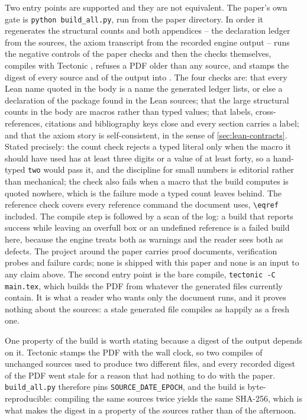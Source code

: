 Two entry points are supported and they are not equivalent. The paper's own gate
is \texttt{python build\_all.py}, run from the paper directory. In order it
regenerates the structural counts and both appendices -- the declaration ledger
from the sources, the axiom transcript from the recorded engine output -- runs the
negative controls of the paper checks and then the checks themselves, compiles
with Tectonic \TectonicVersion{}, refuses a PDF older than any source, and stamps
the digest of every source and of the output into .
The four checks are: that every Lean name quoted in the body is a name the
generated ledger lists, or else a declaration of the package found in the Lean
sources; that the large structural counts in the body are macros rather than
typed values; that labels, cross-references, citations and bibliography
keys close and every section carries a label; and that the axiom story is
self-consistent, in the sense of \cref{sec:lean-contracts}. Stated precisely: the
count check rejects a typed literal only when the macro it should have used has
at least three digits or a value of at least forty, so a hand-typed
\texttt{two} would pass it, and the discipline for small numbers is editorial
rather than mechanical; the check also fails when a macro that the build computes
is quoted nowhere, which is the failure mode a typed count leaves behind. The
reference check covers every reference command the document uses, \verb|\eqref|
included. The compile step is followed by a scan of the log: a build that reports
success while leaving an overfull box or an undefined reference is a failed build
here, because the engine treats both as warnings and the reader sees both as
defects. The project around the paper carries \NumProofDocs{} proof documents,
\NumProbes{} verification probes and \NumFailureCards{} failure cards; none is
shipped with this paper and none is an input to any claim above. The second entry
point is the bare compile, \texttt{tectonic -C main.tex}, which builds the PDF
from whatever the generated files currently contain. It is what a reader who
wants only the document runs, and it proves nothing about the sources: a stale
generated file compiles as happily as a fresh one.

One property of the build is worth stating because a digest of the output depends
on it. Tectonic stamps the PDF with the wall clock, so two compiles of unchanged
sources used to produce two different files, and every recorded digest of the PDF
went stale for a reason that had nothing to do with the paper.
\texttt{build\_all.py} therefore pins \texttt{SOURCE\_DATE\_EPOCH}, and the build
is byte-reproducible: compiling the same sources twice yields the same SHA-256,
which is what makes the digest in  a property of the
sources rather than of the afternoon.

